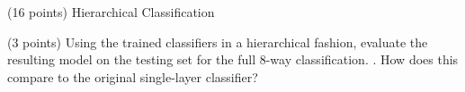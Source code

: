 \documentclass[12pt]{article}
\begin{document}
\begin{question}{(16 points) Hierarchical Classification}
\begin{subquestion}



\end{subquestion}

\begin{subquestion}{(3 points) Using the trained classifiers in a hierarchical fashion, evaluate the resulting model on the testing set for the full 8-way classification. . How does this compare to the original single-layer classifier?}






\end{subquestion}

\end{question}





\clearpage

\end{document}
